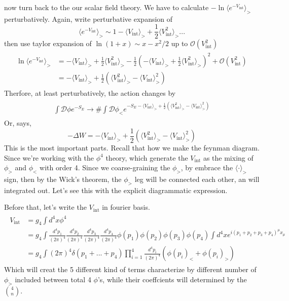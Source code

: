 \documentclass[12pt,halfline,a4paper]{ouparticle}
\begin{document}
now turn back to the our scalar field theory. We have to calculate $-\ln\langle e^{-V_\text{int}}\rangle_>$ perturbatively. Again, write perturbative expansion of
\begin{equation}
	\langle e^{-V_\text{int}}\rangle_> \sim 1-\langle V_\text{int}\rangle_>+\frac{1}{2}\langle V_\text{int}^2\rangle_> ...
\end{equation}
then use taylor expansion of $\ln(1+x)\sim x-x^2/2$ up to $\mathcal O (V_\text{int}^2)$
\begin{align}
	\begin{split}
	\ln\langle e^{-V_\text{int}}\rangle_> &=-\langle V_\text{int}\rangle_> +\frac{1}{2}\langle V_\text{int}^2\rangle_>-\frac{1}{2}(-\langle V_\text{int}\rangle_>+\frac{1}{2}\langle V_\text{int}^2\rangle_>)^2+\mathcal O(V_\text{int}^2)\\
	&=-\langle V_\text{int}\rangle_>+\frac{1}{2}(\langle V_\text{int}^2\rangle_> - \langle V_\text{int}\rangle_>^2)
	\end{split}
\end{align}
Therfore, at least perturbatively, the action changes by
\begin{align}
	\begin{split}
		\int\mathcal D\phi e^{-S_E}\rightarrow \#\int\mathcal D\phi_<e^{-S_E-\langle V_\text{int}\rangle_>+\frac{1}{2}(\langle V_\text{int}^2\rangle_> - \langle V_\text{int}\rangle_>^2)} 
	\end{split}
\end{align}
Or, says,
\begin{equation}
	-\Delta W = -\langle V_\text{int}\rangle_>+\frac{1}{2}(\langle V_\text{int}^2\rangle_> - \langle V_\text{int}\rangle_>^2)
\end{equation}
This is the most important parts. Recall that how we make the feynman diagram. Since we're working with the $\phi^4$ theory, which generate the $V_\text{int}$ as the mixing of $\phi_>$ and $\phi_<$ with order 4.
Since we coarse-graining the $\phi_>$, by embrace the $\langle \cdot \rangle_>$ sign, then by the Wick's theorem, the $\phi_>$ leg will be connected each other, an will integrated out. Let's see this with the explicit diagrammatic expression.

Before that, let's write the $V_\text{int}$ in fourier basis.
\begin{align}
	\begin{split}
		V_\text{int} &= g_4\int d^4x \phi^4 
		\\&= g_4\int \frac{d^4p_1}{(2\pi)^4}\frac{d^4p_2}{(2\pi)^4}\frac{d^4p_3}{(2\pi)^4}\frac{d^4p_4}{(2\pi)^4}\phi(p_1)\phi(p_2)\phi(p_3)\phi(p_4)\int d^4x e^{i(p_1+p_2+p_3+p_4)^\mu x_\mu}\\
		&=g_4\int(2\pi)^4\delta(p_1+...+p_4)\prod_{i=1}^4\frac{d^4p_i}{(2\pi)^4}(\phi(p_i)_<+\phi(p_i)_>)
	\end{split}
\end{align}
Which will creat the 5 different kind of terms characterize by different number of $\phi_>$ included between total 4 $\phi$'s, while their coeffcients will determined by the ${4\choose n}$.
\end{document}
